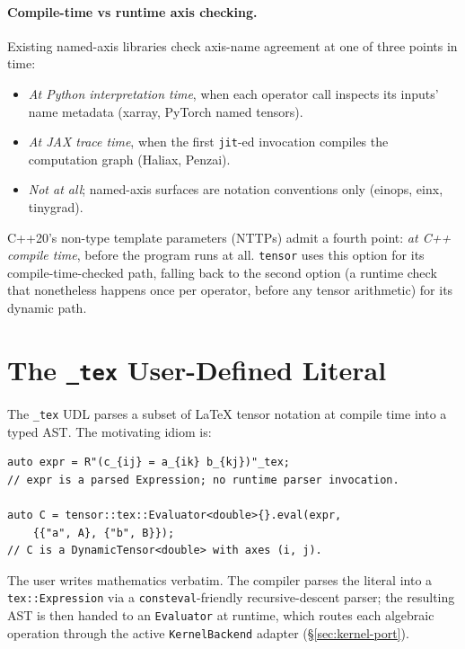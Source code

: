 \documentclass[11pt,a4paper]{article}
\begin{document}
\paragraph{Compile-time vs runtime axis checking.} Existing
named-axis libraries check axis-name agreement at one of three
points in time:

\begin{itemize}
\item \emph{At Python interpretation time}, when each operator
call inspects its inputs' name metadata (xarray, PyTorch named
tensors).
\item \emph{At JAX trace time}, when the first \texttt{jit}-ed
invocation compiles the computation graph (Haliax, Penzai).
\item \emph{Not at all}; named-axis surfaces are notation
conventions only (einops, einx, tinygrad).
\end{itemize}

C++20's non-type template parameters (NTTPs) admit a fourth
point: \emph{at C++ compile time}, before the program runs at
all. \texttt{tensor} uses this option for its compile-time-checked
path, falling back to the second option (a runtime check that
nonetheless happens once per operator, before any tensor
arithmetic) for its dynamic path.

\section{The \texttt{\_tex} User-Defined Literal}
\label{sec:tex-udl}

The \texttt{\_tex} UDL parses a subset of \LaTeX{} tensor
notation at compile time into a typed AST. The motivating idiom is:

\begin{lstlisting}
auto expr = R"(c_{ij} = a_{ik} b_{kj})"_tex;
// expr is a parsed Expression; no runtime parser invocation.

auto C = tensor::tex::Evaluator<double>{}.eval(expr,
    {{"a", A}, {"b", B}});
// C is a DynamicTensor<double> with axes (i, j).
\end{lstlisting}

\noindent The user writes mathematics verbatim. The compiler
parses the literal into a \texttt{tex::Expression} via a
\texttt{consteval}-friendly recursive-descent parser; the
resulting AST is then handed to an \texttt{Evaluator} at runtime,
which routes each algebraic operation through the active
\texttt{KernelBackend} adapter
(\S\ref{sec:kernel-port}).
\end{document}
